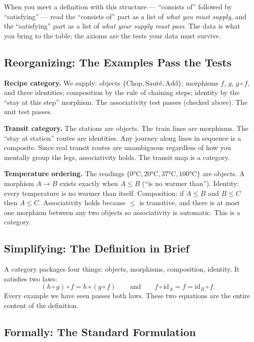 \begin{readernote}
When you meet a definition with this structure --- ``consists of'' followed
by ``satisfying'' --- read the ``consists of'' part as a list of
\emph{what you must supply}, and the ``satisfying'' part as a list of
\emph{what your supply must pass}. The data is what you bring to the table;
the axioms are the tests your data must survive.
\end{readernote}

\subsection{Reorganizing: The Examples Pass the Tests}

\textbf{Recipe category.} We supply: objects $\{\mathrm{Chop}, \mathrm{Sauté},
\mathrm{Add}\}$; morphisms $f$, $g$, $g \circ f$, and three identities;
composition by the rule of chaining steps; identity by the ``stay at this
step'' morphism. The associativity test passes (checked above). The unit
test passes.

\textbf{Transit category.} The stations are objects. The train lines are
morphisms. The ``stay at station'' routes are identities. Any journey along
lines in sequence is a composite. Since real transit routes are unambiguous
regardless of how you mentally group the legs, associativity holds. The
transit map is a category.

\textbf{Temperature ordering.} The readings $\{0°\text{C}, 20°\text{C},
37°\text{C}, 100°\text{C}\}$ are objects. A morphism $A \to B$ exists
exactly when $A \leq B$ (``is no warmer than''). Identity: every temperature
is no warmer than itself. Composition: if $A \leq B$ and $B \leq C$ then
$A \leq C$. Associativity holds because $\leq$ is transitive, and there is
at most one morphism between any two objects so associativity is automatic.
This is a category.

\subsection{Simplifying: The Definition in Brief}

A category packages four things: objects, morphisms, composition,
identity. It satisfies two laws:
\[
  (h \circ g) \circ f = h \circ (g \circ f)
  \qquad\text{and}\qquad
  f \circ \mathrm{id}_A = f = \mathrm{id}_B \circ f.
\]
Every example we have seen passes both laws. These two equations are the
entire content of the definition.

\subsection{Formally: The Standard Formulation}

